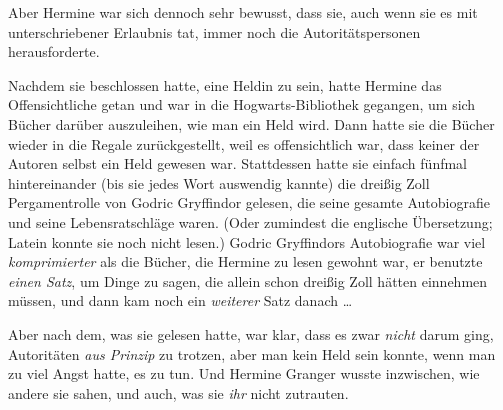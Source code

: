 Aber Hermine war sich dennoch sehr bewusst, dass sie, auch wenn sie es mit unterschriebener Erlaubnis tat, immer noch die Autoritätspersonen herausforderte.

Nachdem sie beschlossen hatte, eine Heldin zu sein, hatte Hermine das Offensichtliche getan und war in die Hogwarts-Bibliothek gegangen, um sich Bücher darüber auszuleihen, wie man ein Held wird. Dann hatte sie die Bücher wieder in die Regale zurückgestellt, weil es offensichtlich war, dass keiner der Autoren selbst ein Held gewesen war. Stattdessen hatte sie einfach fünfmal hintereinander (bis sie jedes Wort auswendig kannte) die dreißig Zoll Pergamentrolle von Godric Gryffindor gelesen, die seine gesamte Autobiografie und seine Lebensratschläge waren. (Oder zumindest die englische Übersetzung; Latein konnte sie noch nicht lesen.) Godric Gryffindors Autobiografie war viel \emph{komprimierter} als die Bücher, die Hermine zu lesen gewohnt war, er benutzte \emph{einen Satz}, um Dinge zu sagen, die allein schon dreißig Zoll hätten einnehmen müssen, und dann kam noch ein \emph{weiterer} Satz danach …

Aber nach dem, was sie gelesen hatte, war klar, dass es zwar \emph{nicht} darum ging, Autoritäten \emph{aus Prinzip} zu trotzen, aber man kein Held sein konnte, wenn man zu viel Angst hatte, es zu tun. Und Hermine Granger wusste inzwischen, wie andere sie sahen, und auch, was sie \emph{ihr} nicht zutrauten.

